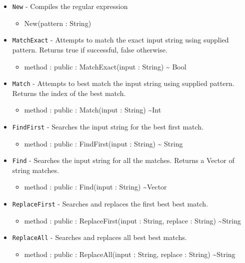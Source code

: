 \documentclass[11pt]{article}
\begin{document}
\begin{itemize}
\item \texttt{New} - Compiles the regular expression
  \begin{itemize}
  \item New(pattern : String)
  \end{itemize}
\item \texttt{MatchExact} - Attempts to match the exact input string
  using supplied pattern.  Returns true if successful, false
  otherwise.
  \begin{itemize}
  \item method : public : MatchExact(input : String) \textasciitilde
    Bool
  \end{itemize}
\item \texttt{Match} - Attempts to best match the input string using
  supplied pattern. Returns the index of the best match.
  \begin{itemize}
  \item method : public : Match(input : String) \textasciitilde Int
  \end{itemize}
\item \texttt{FindFirst} - Searches the input string for the best
  first match.
  \begin{itemize}
  \item method : public : FindFirst(input : String) \textasciitilde
    String
  \end{itemize}
\item \texttt{Find} - Searches the input string for all the
  matches. Returns a Vector of string matches.
  \begin{itemize}
  \item method : public : Find(input : String) \textasciitilde Vector
  \end{itemize}
\item \texttt{ReplaceFirst} - Searches and replaces the first best
  best match.
  \begin{itemize}
  \item method : public : ReplaceFirst(input : String, replace :
    String) \textasciitilde String
  \end{itemize}
\item \texttt{ReplaceAll} - Searches and replaces all best best
  matchs.
  \begin{itemize}
  \item method : public : ReplaceAll(input : String, replace : String)
    \textasciitilde String
  \end{itemize}
\end{itemize}
\end{document}
